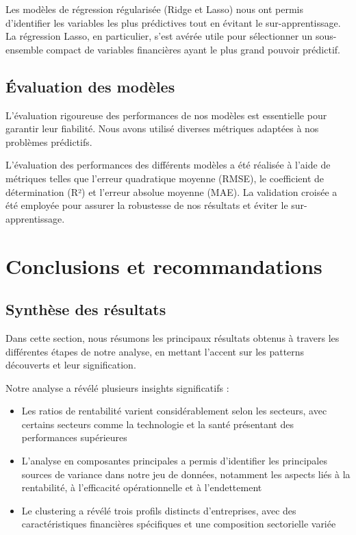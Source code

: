 \documentclass[11pt]{report}
\begin{document}
Les modèles de régression régularisée (Ridge et Lasso) nous ont permis d'identifier les variables les plus prédictives tout en évitant le sur-apprentissage. La régression Lasso, en particulier, s'est avérée utile pour sélectionner un sous-ensemble compact de variables financières ayant le plus grand pouvoir prédictif.

\section{Évaluation des modèles}
L'évaluation rigoureuse des performances de nos modèles est essentielle pour garantir leur fiabilité. Nous avons utilisé diverses métriques adaptées à nos problèmes prédictifs.


L'évaluation des performances des différents modèles a été réalisée à l'aide de métriques telles que l'erreur quadratique moyenne (RMSE), le coefficient de détermination (R²) et l'erreur absolue moyenne (MAE). La validation croisée a été employée pour assurer la robustesse de nos résultats et éviter le sur-apprentissage.

\chapter{Conclusions et recommandations}
\section{Synthèse des résultats}
Dans cette section, nous résumons les principaux résultats obtenus à travers les différentes étapes de notre analyse, en mettant l'accent sur les patterns découverts et leur signification.


Notre analyse a révélé plusieurs insights significatifs :
\begin{itemize}
    \item Les ratios de rentabilité varient considérablement selon les secteurs, avec certains secteurs comme la technologie et la santé présentant des performances supérieures
    \item L'analyse en composantes principales a permis d'identifier les principales sources de variance dans notre jeu de données, notamment les aspects liés à la rentabilité, à l'efficacité opérationnelle et à l'endettement
    \item Le clustering a révélé trois profils distincts d'entreprises, avec des caractéristiques financières spécifiques et une composition sectorielle variée
\end{itemize}
\end{document}

